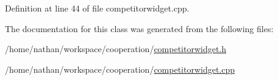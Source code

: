Definition at line 44 of file competitorwidget.cpp.



The documentation for this class was generated from the following files:\begin{DoxyCompactItemize}
\item 
/home/nathan/workspace/cooperation/\hyperlink{competitorwidget_8h}{competitorwidget.h}\item 
/home/nathan/workspace/cooperation/\hyperlink{competitorwidget_8cpp}{competitorwidget.cpp}\end{DoxyCompactItemize}
